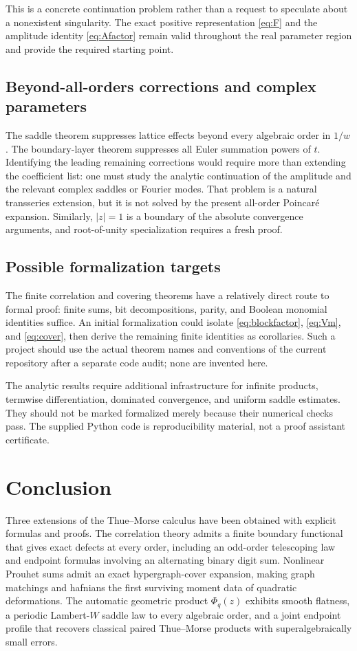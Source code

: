 \documentclass[11pt,oneside]{article}
\numberwithin{equation}{section}
\theoremstyle{definition}
\theoremstyle{remark}
\begin{document}
This is a concrete continuation problem rather than a request to speculate
about a nonexistent singularity. The exact positive representation
\eqref{eq:F} and the amplitude identity \eqref{eq:Afactor} remain valid
throughout the real parameter region and provide the required starting point.

\subsection{Beyond-all-orders corrections and complex parameters}
The saddle theorem suppresses lattice effects beyond every algebraic order
in \(1/w\). The boundary-layer theorem suppresses all Euler summation powers
of \(t\). Identifying the leading remaining corrections would require more
than extending the coefficient list: one must study the analytic continuation
of the amplitude and the relevant complex saddles or Fourier modes.
That problem is a natural transseries extension, but it is not solved by the
present all-order Poincar\'e expansion. Similarly, \(|z|=1\) is a boundary of
the absolute convergence arguments, and root-of-unity specialization requires
a fresh proof.

\subsection{Possible formalization targets}
The finite correlation and covering theorems have a relatively direct route
to formal proof: finite sums, bit decompositions, parity, and Boolean monomial
identities suffice. An initial formalization could isolate
\eqref{eq:blockfactor}, \eqref{eq:Vm}, and \eqref{eq:cover}, then derive the
remaining finite identities as corollaries. Such a project should use the
actual theorem names and conventions of the current repository after a
separate code audit; none are invented here.

The analytic results require additional infrastructure for infinite products,
termwise differentiation, dominated convergence, and uniform saddle estimates.
They should not be marked formalized merely because their numerical checks
pass. The supplied Python code is reproducibility material, not a proof
assistant certificate.

\section{Conclusion}
Three extensions of the Thue--Morse calculus have been obtained with explicit
formulas and proofs. The correlation theory admits a finite boundary functional
that gives exact defects at every order, including an odd-order telescoping
law and endpoint formulas involving an alternating binary digit sum. Nonlinear
Prouhet sums admit an exact hypergraph-cover expansion, making graph matchings
and hafnians the first surviving moment data of quadratic deformations. The
automatic geometric product \(\Phi_q(z)\) exhibits smooth flatness, a periodic
Lambert-\(W\) saddle law to every algebraic order, and a joint endpoint profile
that recovers classical paired Thue--Morse products with superalgebraically
small errors.
\end{document}
